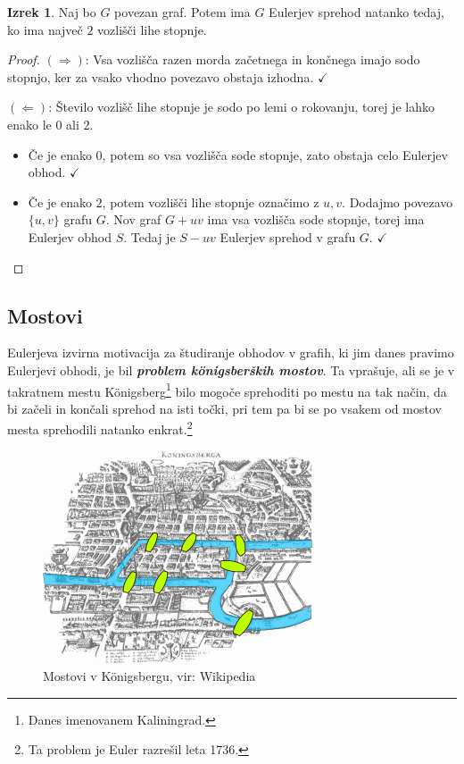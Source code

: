 \documentclass[11pt]{book}
\def\definicija{\color{rdeca}\bf\em}
\def\kljuka{$\checkmark$}
\theoremstyle{definition}
\theoremstyle{zgled}
\theoremstyle{odprtproblem}
\theoremstyle{domacanaloga}
\newenvironment{dokaz}
    {\color{siva}\begin{proof}}
    {\end{proof}}
\theoremstyle{izrek}
\newtheorem*{izrek}{Izrek}
\begin{document}
\begin{izrek}
Naj bo $G$ povezan graf. Potem ima $G$ Eulerjev sprehod natanko tedaj, ko ima največ $2$ vozlišči lihe stopnje.
\end{izrek}
\begin{dokaz}
$(\Rightarrow)$: Vsa vozlišča razen morda začetnega in končnega imajo sodo stopnjo, ker za vsako vhodno povezavo obstaja izhodna. \kljuka

$(\Leftarrow)$: Število vozlišč lihe stopnje je sodo po lemi o rokovanju, torej je lahko enako le $0$ ali $2$. 
\begin{itemize}
    \item Če je enako $0$, potem so vsa vozlišča sode stopnje, zato obstaja celo Eulerjev obhod. \kljuka
    \item Če je enako $2$, potem vozlišči lihe stopnje označimo z $u,v$. Dodajmo povezavo $\{ u, v \}$ grafu $G$. Nov graf $G + uv$ ima vsa vozlišča sode stopnje, torej ima Eulerjev obhod $S$. Tedaj je $S - uv$ Eulerjev sprehod v grafu $G$. \kljuka
\end{itemize}
\end{dokaz}

\subsection{Mostovi}

Eulerjeva izvirna motivacija za študiranje obhodov v grafih, ki jim danes pravimo Eulerjevi obhodi, je bil {\definicija problem königsberških mostov}. Ta vprašuje, ali se je v takratnem mestu Königsberg\footnote{Danes imenovanem Kaliningrad.} bilo mogoče sprehoditi po mestu na tak način, da bi začeli in končali sprehod na isti točki, pri tem pa bi se po vsakem od mostov mesta sprehodili natanko enkrat.\footnote{Ta problem je Euler razrešil leta 1736.}

\begin{figure}[h]
    \centering
    \includegraphics[width=0.5\linewidth]{img/konigsberg.png}
    \caption{Mostovi v Königsbergu, vir: Wikipedia}
\end{figure}    
\end{document}
